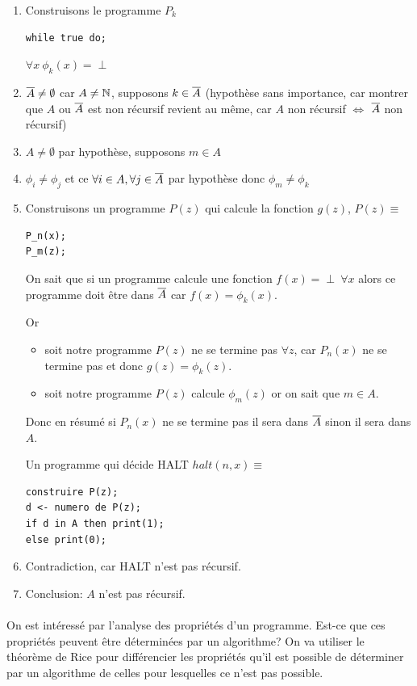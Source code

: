 \begin{enumerate}
	\item Construisons le programme $P_k$
\begin{lstlisting}
while true do;				
\end{lstlisting}
	$\forall x \ \phi_k(x) = \perp$
	\item $\overline{A}\neq \emptyset$ car $A \neq \mathbb{N}$,
	supposons $k\in \overline{A}$ (hypothèse sans importance, car montrer que
	$A$ ou $\overline{A}$ est non récursif revient au même, car $A$ non
	récursif $ \Leftrightarrow $ $\overline{A}$ non récursif) \\
	\item $A\neq \emptyset$ par hypothèse, supposons $m\in A$
	\item $\phi_i \neq \phi_j$ et ce $\forall i \in A, \forall j \in \overline{A}$ par hypothèse donc
		$\phi_m \neq \phi_k$
	\item Construisons un programme $P(z)$ qui calcule la fonction $g(z)$, 
		$P(z) \equiv $
\begin{lstlisting}
P_n(x);
P_m(z);
\end{lstlisting}
	\begin{myrem}
		On sait que si un programme calcule une fonction $
		f(x)=\perp \ \forall x$ alors ce programme doit être dans $\overline{A}$ car
		$f(x) =\phi_k(x)$.

		Or 
		\begin{itemize}
			\item soit notre programme $P(z)$ ne se termine pas $\forall
			z$, car $P_n(x)$ ne se termine pas et donc $g(z) =
			\phi_k(z)$.

		\item soit notre programme $P(z)$ calcule $\phi_m(z)$ or on
			sait que $m\in A$.
		\end{itemize}
		Donc en résumé si $P_n(x)$ ne se termine pas il sera dans
		$\overline{A}$ sinon il sera dans $A$.
	\end{myrem}	
	Un programme qui décide HALT $halt(n,x) \equiv $
\begin{lstlisting}
construire P(z);
d <- numero de P(z);
if d in A then print(1);
else print(0);
\end{lstlisting}
	\item Contradiction, car HALT n'est pas récursif.
	\item Conclusion: $A$ n'est pas récursif.
\end{enumerate}

\paragraph{} On est intéressé par l'analyse des propriétés d'un programme. Est-ce que ces propriétés peuvent être déterminées par un 
algorithme? On va utiliser le théorème de Rice pour différencier les propriétés 
qu'il est possible de déterminer par un algorithme de celles pour lesquelles ce 
n'est pas possible.

